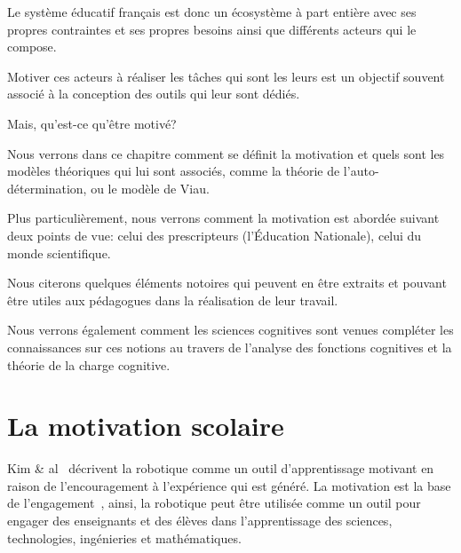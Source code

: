 \begin{resumChap}
Le système éducatif français est donc un écosystème à part entière avec ses propres contraintes et ses propres besoins ainsi que différents acteurs qui le compose.\par%
Motiver ces acteurs à réaliser les tâches qui sont les leurs est un objectif souvent associé à la conception des outils qui leur sont dédiés.
\\\strut\hfill Mais, qu'est-ce qu'être motivé?\hfill\strut\par%
Nous verrons dans ce chapitre comment se définit la motivation et quels sont les modèles théoriques qui lui sont associés, comme la théorie de l'auto-détermination, ou le modèle de Viau.\par%
Plus particulièrement, nous verrons comment la motivation est abordée suivant deux points de vue: \Li celui des prescripteurs (l'Éducation Nationale), \ii celui du monde scientifique.\par%
Nous citerons quelques éléments notoires qui peuvent en être extraits et pouvant être utiles aux pédagogues dans la réalisation de leur travail.\par%
Nous verrons également comment les sciences cognitives sont venues compléter les connaissances sur ces notions au travers de l'analyse des fonctions cognitives et la théorie de la charge cognitive.
\end{resumChap}
\section{La motivation scolaire}\label{sec:motiv}
    Kim \& al~ décrivent la robotique comme un outil d’apprentissage motivant en raison de l’encouragement à l'expérience qui est généré. La motivation est la base de l’engagement~, ainsi, la robotique peut être utilisée comme un outil pour engager des enseignants et des élèves dans l'apprentissage des sciences, technologies, ingénieries et mathématiques.

